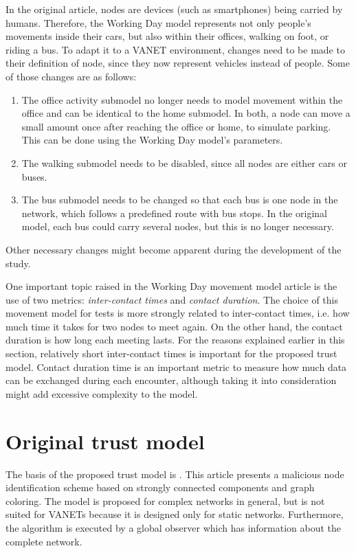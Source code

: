 In the original article, nodes are devices (such as smartphones) being carried by humans.
Therefore, the Working Day model represents not only people's movements inside their cars, but also within their offices, walking on foot, or riding a bus.
To adapt it to a VANET environment, changes need to be made to their definition of node, since they now represent vehicles instead of people. Some of those changes are as follows:
\begin{enumerate}
\item
The office activity submodel no longer needs to model movement within the office and can be identical to the home submodel.
In both, a node can move a small amount once after reaching the office or home, to simulate parking.
This can be done using the Working Day model's parameters.
\item
The walking submodel needs to be disabled, since all nodes are either cars or buses.
\item
The bus submodel needs to be changed so that each bus is one node in the network, which follows a predefined route with bus stops.
In the original model, each bus could carry several nodes, but this is no longer necessary.
\end{enumerate}
Other necessary changes might become apparent during the development of the study.

One important topic raised in the Working Day movement model article is the use of two metrics: \textit{inter-contact times} and \textit{contact duration}.
The choice of this movement model for tests is more strongly related to inter-contact times, i.e. how much time it takes for two nodes to meet again.
On the other hand, the contact duration is how long each meeting lasts.
For the reasons explained earlier in this section, relatively short inter-contact times is important for the proposed trust model.
Contact duration time is an important metric to measure how much data can be exchanged during each encounter, although taking it into consideration might add excessive complexity to the model.


\section{Original trust model}

The basis of the proposed trust model is \cite{vernize2015malicious}.
This article presents a malicious node identification scheme based on strongly connected components and graph coloring.
The model is proposed for complex networks in general, but is not suited for VANETs because it is designed only for static networks.
Furthermore, the algorithm is executed by a global observer which has information about the complete network.

